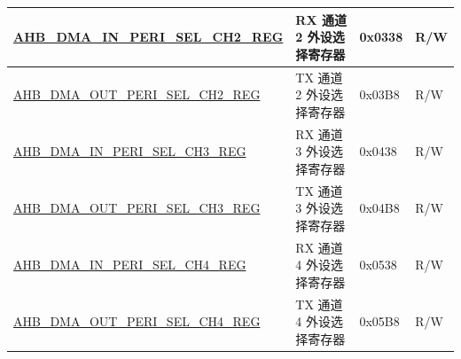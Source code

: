 \begin{longtable}{ | l | l | p{1.3cm} | l | }
\hyperref[regdesc:AHBDMAINPERISELCHNREG]{AHB\_DMA\_IN\_PERI\_SEL\_CH2\_REG} & RX 通道 2 外设选择寄存器 & 0x0338 & R/W    \\ \hline
\hyperref[regdesc:AHBDMAOUTPERISELCHNREG]{AHB\_DMA\_OUT\_PERI\_SEL\_CH2\_REG} & TX 通道 2 外设选择寄存器 & 0x03B8 & R/W    \\ \hline
\hyperref[regdesc:AHBDMAINPERISELCHNREG]{AHB\_DMA\_IN\_PERI\_SEL\_CH3\_REG} & RX 通道 3 外设选择寄存器 & 0x0438 & R/W    \\ \hline
\hyperref[regdesc:AHBDMAOUTPERISELCHNREG]{AHB\_DMA\_OUT\_PERI\_SEL\_CH3\_REG} & TX 通道 3 外设选择寄存器 & 0x04B8 & R/W    \\ \hline
\hyperref[regdesc:AHBDMAINPERISELCHNREG]{AHB\_DMA\_IN\_PERI\_SEL\_CH4\_REG} & RX 通道 4 外设选择寄存器 & 0x0538 & R/W    \\ \hline
\hyperref[regdesc:AHBDMAOUTPERISELCHNREG]{AHB\_DMA\_OUT\_PERI\_SEL\_CH4\_REG} & TX 通道 4 外设选择寄存器 & 0x05B8 & R/W    \\ \hline
\end{longtable}
